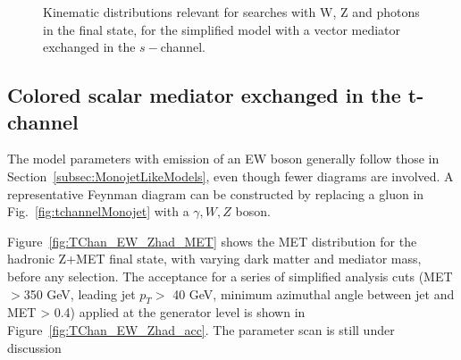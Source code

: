 \begin{figure}[h!]
{	}    
	\hfill
	\caption{Kinematic distributions relevant for searches with W, Z and photons in the final state, 
		for the simplified model with a vector mediator exchanged in the $s-$channel.}
	\label{fig:DMV_EW_kinematics}
\end{figure}

\subsection{Colored scalar mediator exchanged in the t-channel}

The model parameters with emission of an EW boson 
generally follow those in Section~\ref{subsec:MonojetLikeModels},
even though fewer diagrams are involved.   
A representative Feynman diagram can be
constructed by replacing a gluon in Fig.~\ref{fig:tchannelMonojet}
with a $\gamma,W,Z$ boson.

Figure~\ref{fig:TChan_EW_Zhad_MET} shows the MET distribution for the hadronic Z+MET final state, 
with varying dark matter and mediator mass, before any selection. 
The acceptance for a series of simplified analysis cuts 
(MET$>$350 GeV, leading jet $p_T >$ 40 GeV, minimum azimuthal angle between jet and MET > 0.4) 
applied at the generator level is shown in Figure~\ref{fig:TChan_EW_Zhad_acc}. 
The parameter scan is still under discussion~


